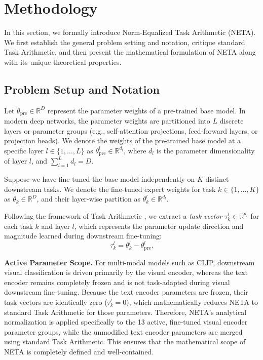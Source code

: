 \section{Methodology}
\label{sec:method}

In this section, we formally introduce Norm-Equalized Task Arithmetic (NETA). We first establish the general problem setting and notation, critique standard Task Arithmetic, and then present the mathematical formulation of NETA along with its unique theoretical properties.

\subsection{Problem Setup and Notation}
Let $\theta_{\text{pre}} \in \mathbb{R}^{D}$ represent the parameter weights of a pre-trained base model. In modern deep networks, the parameter weights are partitioned into $L$ discrete layers or parameter groups (e.g., self-attention projections, feed-forward layers, or projection heads). We denote the weights of the pre-trained base model at a specific layer $l \in \{1, \dots, L\}$ as $\theta_{\text{pre}}^l \in \mathbb{R}^{d_l}$, where $d_l$ is the parameter dimensionality of layer $l$, and $\sum_{l=1}^L d_l = D$.

Suppose we have fine-tuned the base model independently on $K$ distinct downstream tasks. We denote the fine-tuned expert weights for task $k \in \{1, \dots, K\}$ as $\theta_k \in \mathbb{R}^{D}$, and their layer-wise partition as $\theta_k^l \in \mathbb{R}^{d_l}$. 

Following the framework of Task Arithmetic \cite{ilharco2023editing}, we extract a \textit{task vector} $\tau_k^l \in \mathbb{R}^{d_l}$ for each task $k$ and layer $l$, which represents the parameter update direction and magnitude learned during downstream fine-tuning:
\begin{equation}
\label{eq:task_vector}
\tau_k^l = \theta_k^l - \theta_{\text{pre}}^l.
\end{equation}

\textbf{Active Parameter Scope.} For multi-modal models such as CLIP, downstream visual classification is driven primarily by the visual encoder, whereas the text encoder remains completely frozen and is not task-adapted during visual downstream fine-tuning. Because the text encoder parameters are frozen, their task vectors are identically zero ($\tau_k^l = 0$), which mathematically reduces NETA to standard Task Arithmetic for those parameters. Therefore, NETA's analytical normalization is applied specifically to the 13 active, fine-tuned visual encoder parameter groups, while the unmodified text encoder parameters are merged using standard Task Arithmetic. This ensures that the mathematical scope of NETA is completely defined and well-contained.

